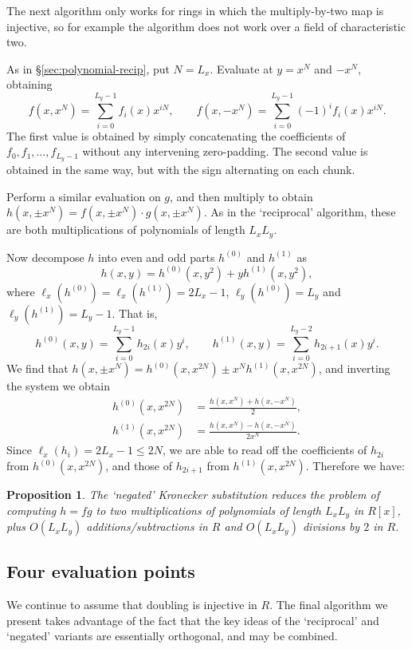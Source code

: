 \documentclass{amsart}
\newtheorem{prop}[thm]{Proposition}
\theoremstyle{definition}
\theoremstyle{remark}
\begin{document}
The next algorithm only works for rings in which the multiply-by-two map is injective, so for example the algorithm does not work over a field of characteristic two.

As in \S\ref{sec:polynomial-recip}, put $N = L_x$. Evaluate at $y = x^N$ and $-x^N$, obtaining
 \[ f(x, x^N) = \sum_{i=0}^{L_y - 1} f_i(x) x^{iN}, \qquad  f(x, -x^N) = \sum_{i=0}^{L_y - 1} (-1)^i f_i(x) x^{iN}. \]
The first value is obtained by simply concatenating the coefficients of $f_0, f_1, \ldots, f_{L_y-1}$ without any intervening zero-padding. The second value is obtained in the same way, but with the sign alternating on each chunk.

Perform a similar evaluation on $g$, and then multiply to obtain $h(x, \pm x^N) = f(x, \pm x^N) \cdot g(x, \pm x^N)$. As in the `reciprocal' algorithm, these are both multiplications of polynomials of length $L_x L_y$.

Now decompose $h$ into even and odd parts $h^{(0)}$ and $h^{(1)}$ as
  \[ h(x, y) = h^{(0)}(x, y^2) + y h^{(1)}(x, y^2), \]
where $\ell_x(h^{(0)}) = \ell_x(h^{(1)}) = 2L_x - 1$, $\ell_y(h^{(0)}) = L_y$ and $\ell_y(h^{(1)}) = L_y - 1$. That is,
 \[  h^{(0)}(x, y) = \sum_{i=0}^{L_y-1} h_{2i}(x) y^i, \qquad h^{(1)}(x, y) = \sum_{i=0}^{L_y-2} h_{2i+1}(x) y^i. \]
We find that $h(x, \pm x^N) = h^{(0)}(x, x^{2N}) \pm x^N h^{(1)}(x, x^{2N})$, and inverting the system we obtain
\begin{align*}
  h^{(0)}(x, x^{2N}) & = \frac{h(x, x^N) + h(x, -x^N)}{2}, \\
  h^{(1)}(x, x^{2N}) & = \frac{h(x, x^N) - h(x, -x^N)}{2x^N}.
\end{align*}
Since $\ell_x(h_i) = 2L_x - 1 \leq 2N$, we are able to read off the coefficients of $h_{2i}$ from $h^{(0)}(x, x^{2N})$, and those of $h_{2i+1}$ from $h^{(1)}(x, x^{2N})$. Therefore we have:
\begin{prop}
\label{prop:polynomial-negate-ks}
The `negated' Kronecker substitution reduces the problem of computing $h = fg$ to two multiplications of polynomials of length $L_x L_y$ in $R[x]$, plus $O(L_x L_y)$ additions/subtractions in $R$ and $O(L_x L_y)$ divisions by $2$ in $R$.
\end{prop}


\subsection{Four evaluation points}
\label{sec:polynomial-four}

We continue to assume that doubling is injective in $R$. The final algorithm we present takes advantage of the fact that the key ideas of the `reciprocal' and `negated' variants are essentially orthogonal, and may be combined.
\end{document}
